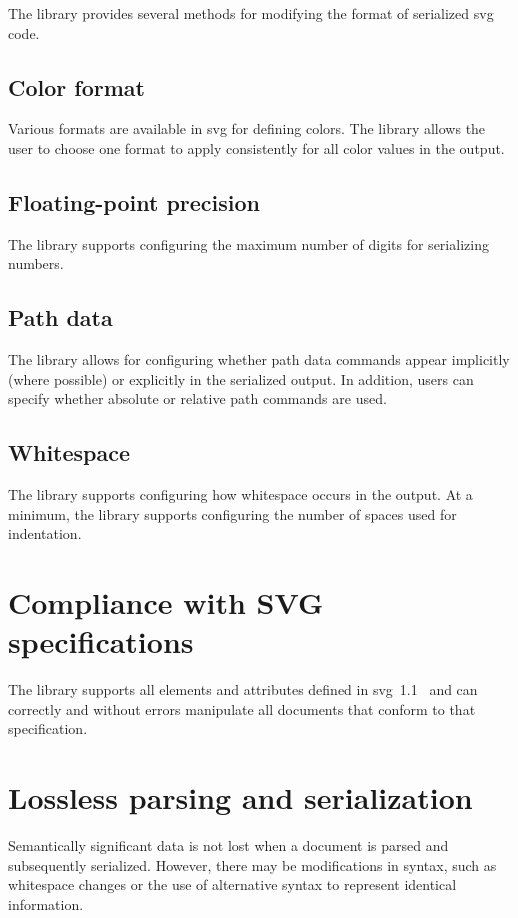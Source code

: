 The library provides several methods for modifying the format of serialized \gls{svg} code.

\subsection{Color format}

Various formats are available in \gls{svg} for defining colors. The library allows the user to choose one format to apply consistently for all color values in the output.

\subsection{Floating-point precision}

The library supports configuring the maximum number of digits for serializing numbers.

\subsection{Path data}

The library allows for configuring whether path data commands appear implicitly (where possible) or explicitly in the serialized output. In addition, users can specify whether absolute or relative path commands are used.

\subsection{Whitespace}

The library supports configuring how whitespace occurs in the output. At a minimum, the library supports configuring the number of spaces used for indentation.

\section{Compliance with SVG specifications}

The library supports all elements and attributes defined in \gls{svg}~1.1~\cite{svg11} and can correctly and without errors manipulate all documents that conform to that specification.

\section{Lossless parsing and serialization}

Semantically significant data is not lost when a document is parsed and subsequently serialized. However, there may be modifications in syntax, such as whitespace changes or the use of alternative syntax to represent identical information.

